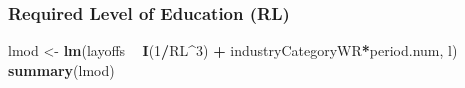 \documentclass[
]{article}
\newenvironment{Shaded}{\begin{snugshade}}{\end{snugshade}}
\newcommand{\DecValTok}[1]{\textcolor[rgb]{0.00,0.00,0.81}{#1}}
\newcommand{\KeywordTok}[1]{\textcolor[rgb]{0.13,0.29,0.53}{\textbf{#1}}}
\newcommand{\NormalTok}[1]{#1}
\newcommand{\OperatorTok}[1]{\textcolor[rgb]{0.81,0.36,0.00}{\textbf{#1}}}
\newcommand{\StringTok}[1]{\textcolor[rgb]{0.31,0.60,0.02}{#1}}
\begin{document}
\hypertarget{required-level-of-education-rl-3}{%
\subsubsection{Required Level of Education
(RL)}\label{required-level-of-education-rl-3}}

\begin{Shaded}
\begin{Highlighting}[]
\NormalTok{lmod <-}\StringTok{ }\KeywordTok{lm}\NormalTok{(layoffs }\OperatorTok{~}\StringTok{ }\KeywordTok{I}\NormalTok{(}\DecValTok{1}\OperatorTok{/}\NormalTok{RL}\OperatorTok{^}\DecValTok{3}\NormalTok{) }\OperatorTok{+}\StringTok{ }\NormalTok{industryCategoryWR}\OperatorTok{*}\NormalTok{period.num, l)}
\KeywordTok{summary}\NormalTok{(lmod)}
\end{Highlighting}
\end{Shaded}
\end{document}
